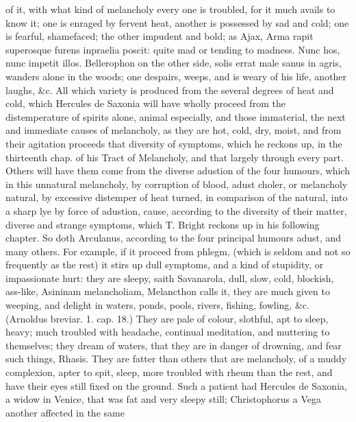 {of it, with what kind of melancholy every one is troubled, for it
much avails to know it; one is enraged by fervent heat, another is
possessed by sad and cold; one is fearful, shamefaced; the other
impudent and bold; as Ajax, Arma rapit superosque furens inpraelia
poscit: quite mad or tending to madness. Nunc hos, nunc impetit illos.
Bellerophon on the other side, solis errat male sanus in agris, wanders
alone in the woods; one despairs, weeps, and is weary of his life,
another laughs, \&c. All which variety is produced from the several
degrees of heat and cold, which Hercules de Saxonia will have
wholly proceed from the distemperature of spirits alone, animal
especially, and those immaterial, the next and immediate causes of
melancholy, as they are hot, cold, dry, moist, and from their agitation
proceeds that diversity of symptoms, which he reckons up, in the
thirteenth chap. of his Tract of Melancholy, and that largely
through every part. Others will have them come from the diverse
adustion of the four humours, which in this unnatural melancholy, by
corruption of blood, adust choler, or melancholy natural, by
excessive distemper of heat turned, in comparison of the natural, into
a sharp lye by force of adustion, cause, according to the diversity of
their matter, diverse and strange symptoms, which T. Bright reckons up
in his following chapter. So doth Arculanus, according to the
four principal humours adust, and many others.
For example, if it proceed from phlegm, (which is seldom and not so
frequently as the rest) it stirs up dull symptoms, and a kind of
stupidity, or impassionate hurt: they are sleepy, saith
Savanarola, dull, slow, cold, blockish, ass-like, Asininam
melancholiam,  Melancthon calls it, they are much given to
weeping, and delight in waters, ponds, pools, rivers, fishing, fowling,
\&c. (Arnoldus breviar. 1. cap. 18.) They are pale of colour,
slothful, apt to sleep, heavy; much troubled with headache,
continual meditation, and muttering to themselves; they dream of
waters, that they are in danger of drowning, and fear such
things, Rhasis. They are fatter than others that are melancholy, of a
muddy complexion, apter to spit,  sleep, more troubled with rheum
than the rest, and have their eyes still fixed on the ground. Such a
patient had Hercules de Saxonia, a widow in Venice, that was fat and
very sleepy still; Christophorus a Vega another affected in the same
}
